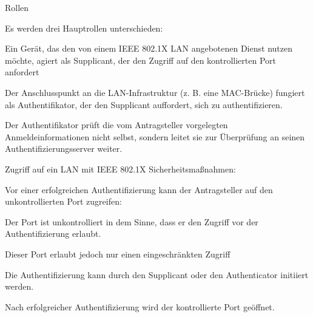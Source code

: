 \documentclass[a4paper]{article}
\begin{document}
\begin{multicols}{3}
      Rollen
      \begin{itemize*}
            \item Es werden drei Hauptrollen unterschieden:
            \begin{itemize*}
                  \item Ein Gerät, das den von einem IEEE 802.1X LAN angebotenen Dienst nutzen möchte, agiert als Supplicant, der den Zugriff auf den kontrollierten Port anfordert
                  \item Der Anschlusspunkt an die LAN-Infrastruktur (z. B. eine MAC-Brücke) fungiert als Authentifikator, der den Supplicant auffordert, sich zu authentifizieren.
                  \item Der Authentifikator prüft die vom Antragsteller vorgelegten Anmeldeinformationen nicht selbst, sondern leitet sie zur Überprüfung an seinen Authentifizierungsserver weiter.
            \end{itemize*}
            \item Zugriff auf ein LAN mit IEEE 802.1X Sicherheitsmaßnahmen:
            \begin{itemize*}
                  \item Vor einer erfolgreichen Authentifizierung kann der Antragsteller auf den unkontrollierten Port zugreifen:
                  \begin{itemize*}
                        \item Der Port ist unkontrolliert in dem Sinne, dass er den Zugriff vor der Authentifizierung erlaubt.
                        \item Dieser Port erlaubt jedoch nur einen eingeschränkten Zugriff
                  \end{itemize*}
                  \item Die Authentifizierung kann durch den Supplicant oder den Authenticator initiiert werden.
                  \item Nach erfolgreicher Authentifizierung wird der kontrollierte Port geöffnet.
            \end{itemize*}
      \end{itemize*}


\end{multicols}
\end{document}
